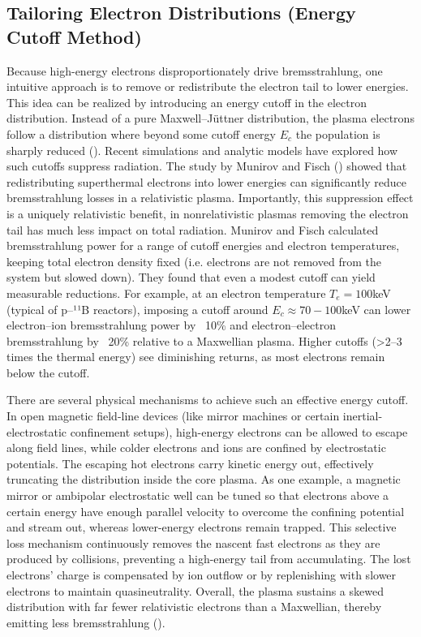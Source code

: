 \documentclass[12pt]{article}
\begin{document}
\subsection{Tailoring Electron Distributions (Energy Cutoff Method)}

Because high-energy electrons disproportionately drive bremsstrahlung, one intuitive approach is to remove or redistribute the electron tail to lower energies. This idea can be realized by introducing an energy cutoff in the electron distribution. Instead of a pure Maxwell–Jüttner distribution, the plasma electrons follow a distribution where beyond some cutoff energy $E_c$ the population is sharply reduced (\cite{SuppressionBremsstrahlung}). Recent simulations and analytic models have explored how such cutoffs suppress radiation. The study by Munirov and Fisch (\cite{Munirov_2023}) showed that redistributing superthermal electrons into lower energies can significantly reduce bremsstrahlung losses in a relativistic plasma. Importantly, this suppression effect is a uniquely relativistic benefit, in nonrelativistic plasmas removing the electron tail has much less impact on total radiation. Munirov and Fisch calculated bremsstrahlung power for a range of cutoff energies and electron temperatures, keeping total electron density fixed (i.e. electrons are not removed from the system but slowed down). They found that even a modest cutoff can yield measurable reductions. For example, at an electron temperature $T_e = 100$keV (typical of p–¹¹B reactors), imposing a cutoff around $E_c \approx 70-100$keV can lower electron–ion bremsstrahlung power by ~10\% and electron–electron bremsstrahlung by ~20\% relative to a Maxwellian plasma. Higher cutoffs (>2–3 times the thermal energy) see diminishing returns, as most electrons remain below the cutoff.

There are several physical mechanisms to achieve such an effective energy cutoff. In open magnetic field-line devices (like mirror machines or certain inertial-electrostatic confinement setups), high-energy electrons can be allowed to escape along field lines, while colder electrons and ions are confined by electrostatic potentials. The escaping hot electrons carry kinetic energy out, effectively truncating the distribution inside the core plasma. As one example, a magnetic mirror or ambipolar electrostatic well can be tuned so that electrons above a certain energy have enough parallel velocity to overcome the confining potential and stream out, whereas lower-energy electrons remain trapped. This selective loss mechanism continuously removes the nascent fast electrons as they are produced by collisions, preventing a high-energy tail from accumulating. The lost electrons’ charge is compensated by ion outflow or by replenishing with slower electrons to maintain quasineutrality. Overall, the plasma sustains a skewed distribution with far fewer relativistic electrons than a Maxwellian, thereby emitting less bremsstrahlung (\cite{SuppressionBremsstrahlung}).
\end{document}
